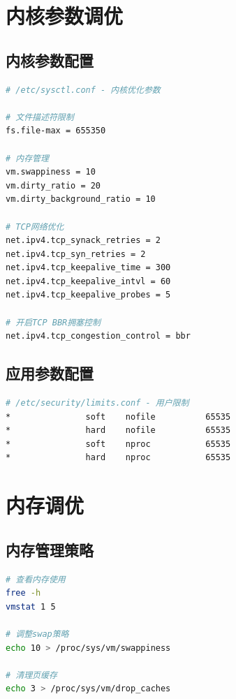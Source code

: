 \documentclass[12pt,UTF8]{ctexbook}
\begin{document}
\section{内核参数调优}
\label{sec:kernel-tuning}

\subsection*{内核参数配置}

\begin{lstlisting}[language=bash]
# /etc/sysctl.conf - 内核优化参数

# 文件描述符限制
fs.file-max = 655350

# 内存管理
vm.swappiness = 10
vm.dirty_ratio = 20
vm.dirty_background_ratio = 10

# TCP网络优化
net.ipv4.tcp_synack_retries = 2
net.ipv4.tcp_syn_retries = 2
net.ipv4.tcp_keepalive_time = 300
net.ipv4.tcp_keepalive_intvl = 60
net.ipv4.tcp_keepalive_probes = 5

# 开启TCP BBR拥塞控制
net.ipv4.tcp_congestion_control = bbr
\end{lstlisting}

\subsection*{应用参数配置}

\begin{lstlisting}[language=bash]
# /etc/security/limits.conf - 用户限制
*               soft    nofile          65535
*               hard    nofile          65535
*               soft    nproc           65535
*               hard    nproc           65535
\end{lstlisting}

\section{内存调优}
\label{sec:memory-tuning}

\subsection*{内存管理策略}

\begin{lstlisting}[language=bash]
# 查看内存使用
free -h
vmstat 1 5

# 调整swap策略
echo 10 > /proc/sys/vm/swappiness

# 清理页缓存
echo 3 > /proc/sys/vm/drop_caches
\end{lstlisting}
\end{document}
